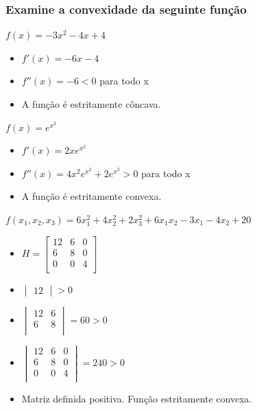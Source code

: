 \documentclass{beamer}
\begin{document}
\begin{frame}
	\frametitle{Examine a convexidade da seguinte função}
	{
	\begin{exampleblock}{$f(x)=-3x^2-4x+4$} 
		\begin{itemize}
		\item[] $f'(x) = -6x - 4$
		\item[] $f''(x) = -6 < 0$ para todo x
		\item[] A função é estritamente côncava.
		\end{itemize}
	\end{exampleblock}
	}
	{
	\begin{exampleblock}{$f(x)=e^{x^2}$} 
		\begin{itemize}
		\item[] $f'(x) = 2xe^{x^2}$
		\item[] $f''(x) = 4x^2e^{x^2}+2e^{x^2} > 0$ para todo x
		\item[] A função é estritamente convexa.
		\end{itemize}
	\end{exampleblock}
	}	
	{
	\begin{exampleblock}{$f(x_1,x_2,x_3)=6x_1^2+4x_2^2+2x_3^2+6x_1x_2-3x_1-4x_2+20$} 
		\begin{itemize}
		\item[] 
				$ H = \begin{bmatrix}
									  12 & 6 & 0 \\
									   6  & 8 & 0 \\
									   0  & 0 & 4 \\
					   \end{bmatrix} 
				$
		\item[] 
				$ \begin{vmatrix}
							     12
				  \end{vmatrix} > 0 
				$
		\item[] 
				$ \begin{vmatrix}
									  12 & 6 \\
									   6 & 8 \\
				   \end{vmatrix} = 60 > 0 
				$		
		\item[]
				$ \begin{vmatrix}
									  12 & 6 & 0 \\
									   6  & 8 & 0 \\
									   0  & 0 & 4 \\
				   \end{vmatrix} = 240 > 0 
				$
		\item[] Matriz definida positiva. Função estritamente convexa.		
		\end{itemize}
	\end{exampleblock}
	}		
\end{frame}
\end{document}
